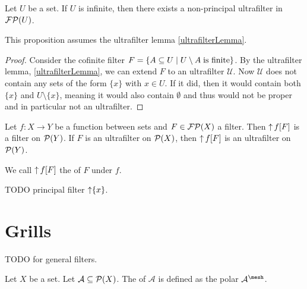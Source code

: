 \begin{proposition}
Let $U$ be a set. If $U$ is infinite, then there exists a non-principal ultrafilter in $\operatorname{\mathcal{FP}}(U)$.
\end{proposition}
This proposition assumes the ultrafilter lemma \ref{ultrafilterLemma}.
\begin{proof}
Consider the cofinite filter $F = \left\{ A\subseteq U \;\middle|\; U\setminus A\;\text{is finite} \right\}$. By the ultrafilter lemma, \ref{ultrafilterLemma}, we can extend $F$ to an ultrafilter $\mathcal{U}$. Now $\mathcal{U}$ does not contain any sets of the form $\{x\}$ with $x\in U$. If it did, then it would contain both $\{x\}$ and $U\setminus\{x\}$, meaning it would also contain $\emptyset$ and thus would not be proper and in particular not an ultrafilter.
\end{proof}

\begin{proposition}
Let $f:X\to Y$ be a function between sets and $F\in \operatorname{\mathcal{FP}}(X)$ a filter. Then $\operatorname{\uparrow} f[F]$ is a filter on $\operatorname{\mathcal{P}}(Y)$. If $F$ is an ultrafilter on $\operatorname{\mathcal{P}}(X)$, then $\operatorname{\uparrow} f[F]$ is an ultrafilter on $\operatorname{\mathcal{P}}(Y)$.
\end{proposition}
We call $\operatorname{\uparrow} f[F]$ the  of $F$ under $f$.

\begin{definition}
TODO principal filter $\operatorname{\uparrow}\{x\}$.
\end{definition}

\section{Grills}
TODO for general filters.
\begin{definition}
Let $X$ be a set. Let $\mathcal{A} \subseteq \operatorname{\mathcal{P}}(X)$. The  of $\mathcal{A}$ is defined as the polar $\mathcal{A}^{\mesh}$.
\end{definition}

